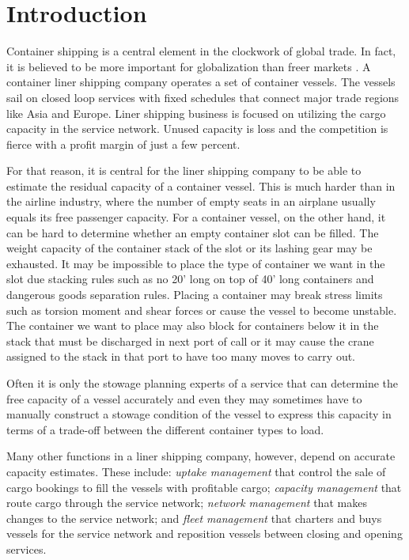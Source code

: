 %

%
\section{Introduction}

Container shipping is a central element in the clockwork of global trade. In fact, it is believed to be more important for globalization than freer markets \cite{EC13}. A container liner shipping company operates a set of container vessels. The vessels sail on closed loop services with fixed  schedules that connect major trade regions like Asia and Europe. Liner shipping business is focused on utilizing the cargo capacity in the service network. Unused capacity is loss and the competition is fierce with a profit margin of just a few percent.  

For that reason, it is central for the liner shipping company to be able to estimate the residual capacity of a container vessel. This is much harder than in the airline industry, where the number of empty seats in an airplane usually equals its free passenger capacity. For a container vessel, on the other hand, it can be hard to determine whether an empty container slot can be filled. The weight capacity of the container stack of the slot or its lashing gear may be exhausted. It may be impossible to place the type of container we want in the slot due stacking rules such as no 20' long on top of 40' long containers and dangerous goods separation rules. Placing a container may break stress limits such as torsion moment and shear forces or cause the vessel to become unstable. The container we want to place may also block for containers below it in the stack that must be discharged in next port of call or it may cause the crane assigned to the stack in that port to have too many moves to carry out. 

Often it is only the stowage planning experts of a service that can determine the free capacity of a vessel accurately and even they may sometimes have to manually construct a stowage condition of the vessel to express this capacity in terms of a trade-off between the different container types to load.

Many other functions in a liner shipping company, however, depend on accurate capacity estimates. These include: {\em uptake management} that control the sale of cargo bookings to fill the vessels with profitable cargo; {\em capacity management} that route cargo through the service network; {\em network management} that makes changes to the service network; and {\em fleet management} that charters and buys vessels for the service network and reposition vessels between closing and opening services.  

